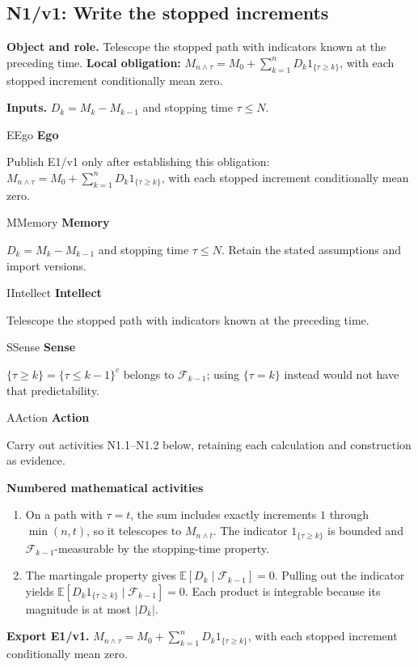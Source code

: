 \documentclass[preprint,12pt,aps,pra,showkeys,amsmath,amssymb,superscriptaddress,floatfix]{revtex4-2}
\theoremstyle{definition}
\theoremstyle{remark}
\newcommand{\mmfaculty}[3]{%
 \begin{mmfacultybox}{#1}{#2}
 {\sffamily\bfseries\color{MMBlue}#2}\par\smallskip #3
 \end{mmfacultybox}}
\newcommand{\field}[2]{\par\smallskip\noindent\textbf{#1.} #2\par}
\begin{document}
\subsection{N1/v1: Write the stopped increments}

\field{Object and role}{Telescope the stopped path with indicators known at the preceding time.
\textbf{Local obligation:}
\(M_{n\wedge\tau}=M_0+\sum_{k=1}^nD_k1_{\{\tau\ge k\}}\), with each
stopped increment conditionally mean zero.}

\field{Inputs}{\(D_k=M_k-M_{k-1}\) and stopping time \(\tau\le N\).}

\mmfaculty{E}{Ego}{Publish E1/v1 only after establishing this obligation:
\(M_{n\wedge\tau}=M_0+\sum_{k=1}^nD_k1_{\{\tau\ge k\}}\), with each
stopped increment conditionally mean zero.}

\mmfaculty{M}{Memory}{\(D_k=M_k-M_{k-1}\) and stopping time \(\tau\le N\). Retain the stated
assumptions and import versions.}

\mmfaculty{I}{Intellect}{Telescope the stopped path with indicators known at the preceding time.}

\mmfaculty{S}{Sense}{\(\{\tau\ge k\}=\{\tau\le k-1\}^c\) belongs to \(\mathcal F_{k-1}\);
using \(\{\tau=k\}\) instead would not have that predictability.}

\mmfaculty{A}{Action}{Carry out activities N1.1--N1.2 below, retaining each calculation and
construction as evidence.}

\smallskip\noindent\textbf{Numbered mathematical activities}

\begin{enumerate}[label=N1.\arabic*,leftmargin=3.4em]

\item On a path with \(\tau=t\), the sum includes exactly increments \(1\)
through \(\min(n,t)\), so it telescopes to \(M_{n\wedge t}\). The
indicator \(1_{\{\tau\ge k\}}\) is bounded and
\(\mathcal F_{k-1}\)-measurable by the stopping-time property.

\item The martingale property gives \(\mathbb E[D_k\mid\mathcal F_{k-1}]=0\).
Pulling out the indicator yields
\(\mathbb E[D_k1_{\{\tau\ge k\}}\mid\mathcal F_{k-1}]=0\). Each product
is integrable because its magnitude is at most \(|D_k|\).

\end{enumerate}

\field{Export E1/v1}{\(M_{n\wedge\tau}=M_0+\sum_{k=1}^nD_k1_{\{\tau\ge k\}}\), with each
stopped increment conditionally mean zero.}
\end{document}
